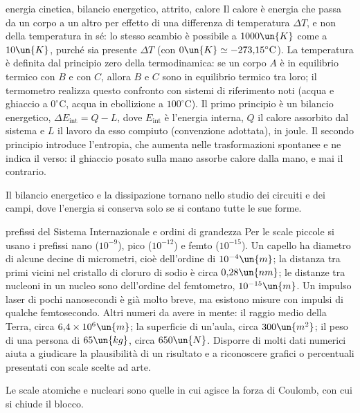 \documentclass[main.tex]{subfiles}
\begin{document}
\begin{riquadro}{energia cinetica, bilancio energetico, attrito, calore}
Il calore è energia che passa da un corpo a un altro per effetto di una differenza di temperatura $\Delta T$, e non della temperatura in sé: lo stesso scambio è possibile a $1000\un{K}$ come a $10\un{K}$, purché sia presente $\Delta T$ (con $0\un{K}\simeq-273{,}15^\circ\mathrm{C}$). La temperatura è definita dal principio zero della termodinamica: se un corpo $A$ è in equilibrio termico con $B$ e con $C$, allora $B$ e $C$ sono in equilibrio termico tra loro; il termometro realizza questo confronto con sistemi di riferimento noti (acqua e ghiaccio a $0^\circ\mathrm{C}$, acqua in ebollizione a $100^\circ\mathrm{C}$). Il primo principio è un bilancio energetico, $\Delta E_{\mathrm{int}}=Q-L$, dove $E_{\mathrm{int}}$ è l'energia interna, $Q$ il calore assorbito dal sistema e $L$ il lavoro da esso compiuto (convenzione adottata), in joule. Il secondo principio introduce l'entropia, che aumenta nelle trasformazioni spontanee e ne indica il verso: il ghiaccio posato sulla mano assorbe calore dalla mano, e mai il contrario.

Il bilancio energetico e la dissipazione tornano nello studio dei circuiti e dei campi, dove l'energia si conserva solo se si contano tutte le sue forme.
\end{riquadro}

\renewcommand{\richiamoprefix}{Richiamo di Fisica 1 --- }
\begin{riquadro}{prefissi del Sistema Internazionale e ordini di grandezza}
Per le scale piccole si usano i prefissi nano ($10^{-9}$), pico ($10^{-12}$) e femto ($10^{-15}$). Un capello ha diametro di alcune decine di micrometri, cioè dell'ordine di $10^{-4}\un{m}$; la distanza tra primi vicini nel cristallo di cloruro di sodio è circa $0{,}28\un{nm}$; le distanze tra nucleoni in un nucleo sono dell'ordine del femtometro, $10^{-15}\un{m}$. Un impulso laser di pochi nanosecondi è già molto breve, ma esistono misure con impulsi di qualche femtosecondo. Altri numeri da avere in mente: il raggio medio della Terra, circa $6{,}4\times10^{6}\un{m}$; la superficie di un'aula, circa $300\un{m^2}$; il peso di una persona di $65\un{kg}$, circa $650\un{N}$. Disporre di molti dati numerici aiuta a giudicare la plausibilità di un risultato e a riconoscere grafici o percentuali presentati con scale scelte ad arte.

Le scale atomiche e nucleari sono quelle in cui agisce la forza di Coulomb, con cui si chiude il blocco.
\end{riquadro}
\end{document}
